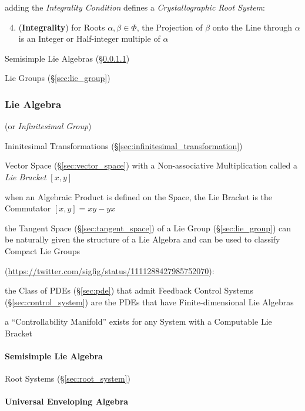 adding the \emph{Integrality Condition} defines a \emph{Crystallographic Root
  System}:
\begin{enumerate}
  \setcounter{enumi}{3}
  \item (\textbf{Integrality}) for Roots $\alpha, \beta \in \Phi$, the
    Projection of $\beta$ onto the Line through $\alpha$ is an Integer or
    Half-integer multiple of $\alpha$
\end{enumerate}

Semisimple Lie Algebras (\S\ref{sec:semisimple_lie})

Lie Groups (\S\ref{sec:lie_group})



\subsubsection{Lie Algebra}\label{sec:lie_algebra}

(or \emph{Infinitesimal Group})

Ininitesimal Transformations
(\S\ref{sec:infinitesimal_transformation})

Vector Space (\S\ref{sec:vector_space}) with a Non-associative
Multiplication called a \emph{Lie Bracket} $[x,y]$

when an Algebraic Product is defined on the Space, the Lie Bracket is
the Commutator $[x,y] = xy - yx$ %

the Tangent Space (\S\ref{sec:tangent_space}) of a Lie Group
(\S\ref{sec:lie_group}) can be naturally given the structure of a Lie Algebra
and can be used to classify Compact Lie Groups

(\url{https://twitter.com/sigfig/status/1111288427985752070}):

the Class of PDEs (\S\ref{sec:pde}) that admit Feedback Control Systems
(\S\ref{sec:control_system}) are the PDEs that have Finite-dimensional Lie
Algebras

a ``Controllability Manifold'' exists for any System with a Computable Lie
Bracket



\paragraph{Semisimple Lie Algebra}\label{sec:semisimple_lie}\hfill

Root Systems (\S\ref{sec:root_system})



\paragraph{Universal Enveloping Algebra}
\label{sec:universal_enveloping_algebra}\hfill

